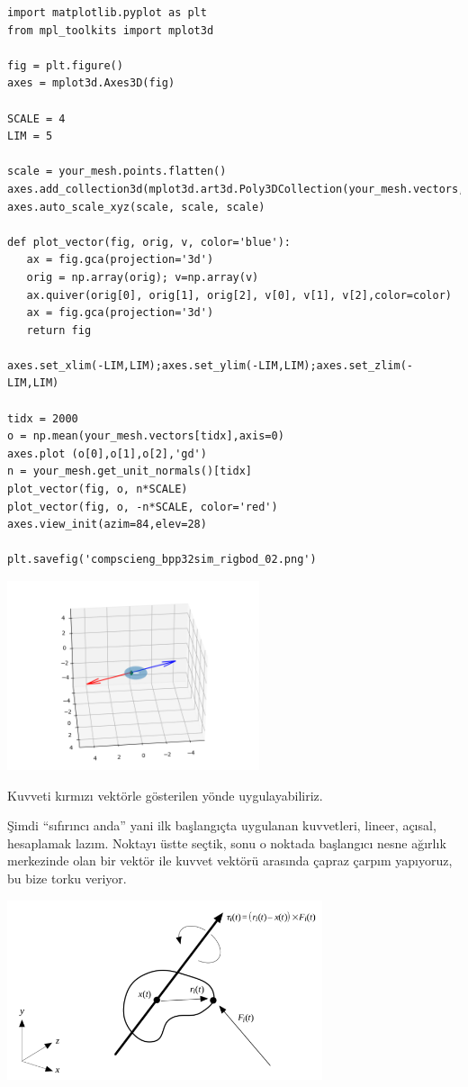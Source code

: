 \documentclass[12pt,fleqn]{article}\usepackage{../../common}
\begin{document}
\begin{verbatim}
import matplotlib.pyplot as plt
from mpl_toolkits import mplot3d

fig = plt.figure()
axes = mplot3d.Axes3D(fig)

SCALE = 4
LIM = 5

scale = your_mesh.points.flatten()
axes.add_collection3d(mplot3d.art3d.Poly3DCollection(your_mesh.vectors,alpha=0.3))
axes.auto_scale_xyz(scale, scale, scale)

def plot_vector(fig, orig, v, color='blue'):
   ax = fig.gca(projection='3d')
   orig = np.array(orig); v=np.array(v)
   ax.quiver(orig[0], orig[1], orig[2], v[0], v[1], v[2],color=color)
   ax = fig.gca(projection='3d')  
   return fig

axes.set_xlim(-LIM,LIM);axes.set_ylim(-LIM,LIM);axes.set_zlim(-LIM,LIM)

tidx = 2000
o = np.mean(your_mesh.vectors[tidx],axis=0)
axes.plot (o[0],o[1],o[2],'gd')
n = your_mesh.get_unit_normals()[tidx]
plot_vector(fig, o, n*SCALE)
plot_vector(fig, o, -n*SCALE, color='red')
axes.view_init(azim=84,elev=28)

plt.savefig('compscieng_bpp32sim_rigbod_02.png')
\end{verbatim}

\includegraphics[width=20em]{compscieng_bpp32sim_rigbod_02.png}

Kuvveti kırmızı vektörle gösterilen yönde uygulayabiliriz.

Şimdi ``sıfırıncı anda'' yani ilk başlangıçta uygulanan kuvvetleri, lineer,
açısal, hesaplamak lazım. Noktayı üstte seçtik, sonu o noktada başlangıcı nesne
ağırlık merkezinde olan bir vektör ile kuvvet vektörü arasında çapraz çarpım
yapıyoruz, bu bize torku veriyor.

\includegraphics[width=25em]{compscieng_bpp32sim_rigbod_03.png}
\end{document}

